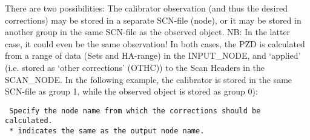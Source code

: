 There are two possibilities: The calibrator observation (and thus the desired
corrections) may be stored in a separate SCN-file (node), or it may be stored
in another group in the same SCN-file as the observed object. NB: In the latter
case, it could even be the same observation!  In both cases, the PZD is
calculated from a range of data (Sets and HA-range) in the INPUT\_NODE, and
`applied' (i.e. stored as `other corrections' (OTHC)) to the Scan Headers in
the SCAN\_NODE. In the following example, the calibrator is stored in the same
SCN-file as group 1, while the observed object is stored as group 0):

\spbegin %
\spend %
%
\spbegin %
\spend %
%
\spbegin %
\suser{\scr}
\spend %
%
\spbegin %
\spend %
%
\spbegin %
\sdefault{= *:}
\svbegin \begin{verbatim}
 Specify the node name from which the corrections should be calculated.
 * indicates the same as the output node name.
\end{verbatim}\svend
\spend %
%
\spbegin %
\sdefault{= *:}
\suser{*}
\spend %
%
\spbegin %
